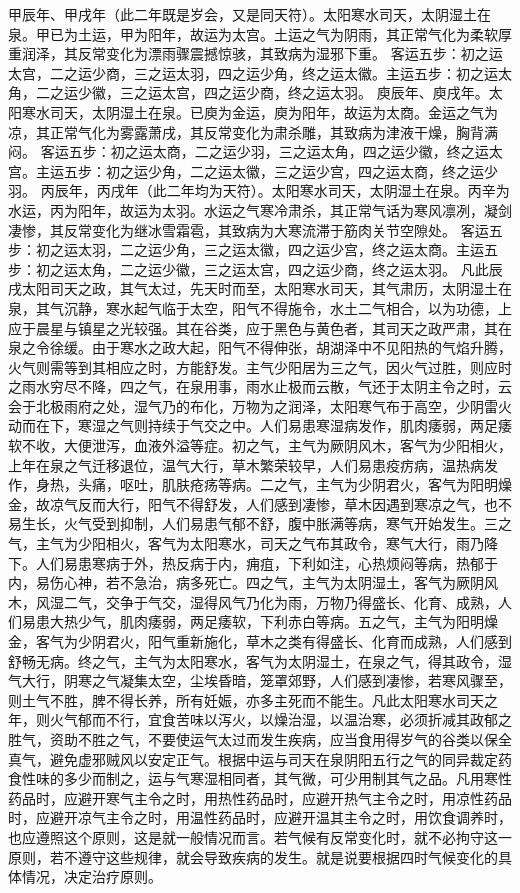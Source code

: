 \documentclass[a4paper,12pt,UTF8,twoside]{ctexbook}
\begin{document}
甲辰年、甲戌年（此二年既是岁会，又是同天符）。太阳寒水司天，太阴湿土在泉。甲已为土运，甲为阳年，故运为太宫。土运之气为阴雨，其正常气化为柔软厚重润泽，其反常变化为漂雨骤震撼惊骇，其致病为湿邪下重。
客运五步：初之运太宫，二之运少商，三之运太羽，四之运少角，终之运太徽。主运五步：初之运太角，二之运少徽，三之运太宫，四之运少商，终之运太羽。
庾辰年、庾戌年。太阳寒水司天，太阴湿土在泉。已庾为金运，庾为阳年，故运为太商。金运之气为凉，其正常气化为雾露萧戌，其反常变化为肃杀雕，其致病为津液干燥，胸背满闷。
客运五步：初之运太商，二之运少羽，三之运太角，四之运少徽，终之运太宫。主运五步：初之运少角，二之运太徽，三之运少宫，四之运太商，终之运少羽。
丙辰年，丙戌年（此二年均为天符）。太阳寒水司天，太阴湿土在泉。丙辛为水运，丙为阳年，故运为太羽。水运之气寒冷肃杀，其正常气话为寒风凛冽，凝剑凄惨，其反常变化为继冰雪霜雹，其致病为大寒流滞于筋肉关节空隙处。
客运五步：初之运太羽，二之运少角，三之运太徽，四之运少宫，终之运太商。主运五步：初之运太角，二之运少徽，三之运太宫，四之运少商，终之运太羽。
凡此辰戌太阳司天之政，其气太过，先天时而至，太阳寒水司天，其气肃历，太阴湿土在泉，其气沉静，寒水起气临于太空，阳气不得施令，水土二气相合，以为功德，上应于晨星与镇星之光较强。其在谷类，应于黑色与黄色者，其司天之政严肃，其在泉之令徐缓。由于寒水之政大起，阳气不得伸张，胡湖泽中不见阳热的气焰升腾，火气则需等到其相应之时，方能舒发。主气少阳居为三之气，因火气过胜，则应时之雨水穷尽不降，四之气，在泉用事，雨水止极而云散，气还于太阴主令之时，云会于北极雨府之处，湿气乃的布化，万物为之润泽，太阳寒气布于高空，少阴雷火动而在下，寒湿之气则持续于气交之中。人们易患寒湿病发作，肌肉痿弱，两足痿软不收，大便泄泻，血液外溢等症。初之气，主气为厥阴风木，客气为少阳相火，上年在泉之气迁移退位，温气大行，草木繁荣较早，人们易患疫疠病，温热病发作，身热，头痛，呕吐，肌肤疮疡等病。二之气，主气为少阴君火，客气为阳明燥金，故凉气反而大行，阳气不得舒发，人们感到凄惨，草木因遇到寒凉之气，也不易生长，火气受到抑制，人们易患气郁不舒，腹中胀满等病，寒气开始发生。三之气，主气为少阳相火，客气为太阳寒水，司天之气布其政令，寒气大行，雨乃降下。人们易患寒病于外，热反病于内，痈疽，下利如注，心热烦闷等病，热郁于内，易伤心神，若不急治，病多死亡。四之气，主气为太阴湿土，客气为厥阴风木，风湿二气，交争于气交，湿得风气乃化为雨，万物乃得盛长、化育、成熟，人们易患大热少气，肌肉痿弱，两足痿软，下利赤白等病。五之气，主气为阳明燥金，客气为少阴君火，阳气重新施化，草木之类有得盛长、化育而成熟，人们感到舒畅无病。终之气，主气为太阳寒水，客气为太阴湿土，在泉之气，得其政令，湿气大行，阴寒之气凝集太空，尘埃昏暗，笼罩郊野，人们感到凄惨，若寒风骤至，则土气不胜，脾不得长养，所有妊娠，亦多主死而不能生。凡此太阳寒水司天之年，则火气郁而不行，宜食苦味以泻火，以燥治湿，以温治寒，必须折减其政郁之胜气，资助不胜之气，不要使运气太过而发生疾病，应当食用得岁气的谷类以保全真气，避免虚邪贼风以安定正气。根据中运与司天在泉阴阳五行之气的同异裁定药食性味的多少而制之，运与气寒湿相同者，其气微，可少用制其气之品。凡用寒性药品时，应避开寒气主令之时，用热性药品时，应避开热气主令之时，用凉性药品时，应避开凉气主令之时，用温性药品时，应避开温其主令之时，用饮食调养时，也应遵照这个原则，这是就一般情况而言。若气候有反常变化时，就不必拘守这一原则，若不遵守这些规律，就会导致疾病的发生。就是说要根据四时气候变化的具体情况，决定治疗原则。
\end{document}
